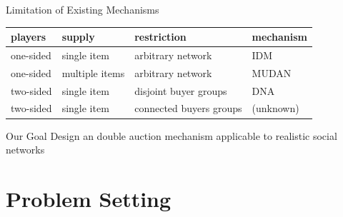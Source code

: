 \documentclass{beamer}
\begin{document}
\begin{frame}{Limitation of Existing Mechanisms}
	\begin{center}
		\begin{tabular}{ll|l|l}
			players   & supply         & restriction             & mechanism \\
			\hline
			one-sided & single item    & arbitrary network       & IDM       \\
			one-sided & multiple items & arbitrary network       & MUDAN     \\
			two-sided & single item    & disjoint buyer groups   & DNA       \\
			two-sided & single item    & connected buyers groups & (unknown) \\
		\end{tabular}
	\end{center}

	\begin{block}{Our Goal}
		Design an double auction mechanism applicable to realistic social networks
	\end{block}
\end{frame}



\section{Problem Setting}
\end{document}
